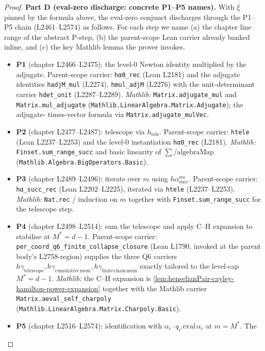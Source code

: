 \begin{proof}
\textbf{Part D (eval-zero discharge: concrete P1--P5 names).}
With $\xi$ pinned by the formula above, the eval-zero conjunct
discharges through the P1--P5 chain (L2461--L2574) as follows.
For each step we name (a) the chapter line range of the abstract
P-step, (b) the parent-scope Lean carrier already banked inline,
and (c) the key Mathlib lemma the prover invokes.
\begin{itemize}
\item \textbf{P1} (chapter L2466--L2475): the level-$0$ Newton
identity multiplied by the adjugate. Parent-scope carrier:
\texttt{hα0\_rec} (Lean L2181) and the adjugate identities
\texttt{hadjM\_mul} (L2274), \texttt{hmul\_adjM} (L2276) with the
unit-determinant carrier \texttt{hdet\_unit} (L2287--L2289).
\textit{Mathlib:} \texttt{Matrix.adjugate\_mul} and
\texttt{Matrix.mul\_adjugate}
(\texttt{Mathlib.LinearAlgebra.Matrix.Adjugate}); the adjugate-
times-vector formula via \texttt{Matrix.adjugate\_mulVec}.
\item \textbf{P2} (chapter L2477--L2487): telescope via
$h_{\mathrm{tele}}$. Parent-scope carrier: \texttt{htele} (Lean
L2237--L2253) and the level-$0$ instantiation
\texttt{hα0\_rec} (L2181). \textit{Mathlib:}
\texttt{Finset.sum\_range\_succ} and basic linearity of
$\sum$/$\mathrm{algebraMap}$
(\texttt{Mathlib.Algebra.BigOperators.Basic}).
\item \textbf{P3} (chapter L2489--L2496): iterate over $m$ using
$h\alpha_{\mathrm{succ}}^{\mathrm{rec}}$. Parent-scope carrier:
\texttt{hα\_succ\_rec} (Lean L2202--L2225), iterated via
\texttt{htele} (L2237--L2253). \textit{Mathlib:}
\texttt{Nat.rec} / induction on $m$ together with
\texttt{Finset.sum\_range\_succ} for the telescope step.
\item \textbf{P4} (chapter L2498--L2514): sum the telescope and
apply C--H expansion to stabilise at $M^* = d - 1$. Parent-scope
carrier: \texttt{per\_coord\_q6\_finite\_collapse\_closure} (Lean
L1790, invoked at the parent body's L2758-region) supplies the
three Q6 carriers $h\gamma_{\mathrm{telescope}},
h\gamma_{\mathrm{cumulative\,mem}}, h\gamma_{\mathrm{finite\,chain\,mem}}$
exactly tailored to the level-cap $M^* = d - 1$.
\textit{Mathlib:} the C--H expansion is
\cref{lem:henselianPair-cayley-hamilton-power-expansion}
together with the Mathlib carrier
\texttt{Matrix.aeval\_self\_charpoly}
(\texttt{Mathlib.LinearAlgebra.Matrix.Charpoly.Basic}).
\item \textbf{P5} (chapter L2516--L2574): identification with
$\alpha_i \cdot q_i.\mathrm{eval}\,\alpha_i$ at $m = M^*$. The

\end{itemize}
\end{proof}

